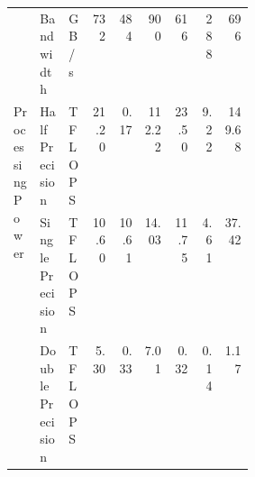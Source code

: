 \begin{tabular}{p{0.11\linewidth}p{0.12\linewidth}p{0.082\linewidth}|rrrrrr}
    \cline{2-9}
                                                  & Bandwidth                & GB/s                 & 732   & 484    & 900    & 616    & 288    & 696    \\
    \cline{1-9} \cline{2-9}
    \multirow[t]{3}{\linewidth}{Processing Power} & Half Precision           & \footnotesize TFLOPS & 21.20 & 0.17   & 112.22 & 23.50  & 9.22   & 149.68 \\
    \cline{2-9}
                                                  & Single Precision         & \footnotesize TFLOPS & 10.60 & 10.61  & 14.03  & 11.75  & 4.61   & 37.42  \\
    \cline{2-9}
                                                  & Double Precision         & \footnotesize TFLOPS & 5.30  & 0.33   & 7.01   & 0.32   & 0.14   & 1.17   \\
    \bottomrule
\end{tabular}
